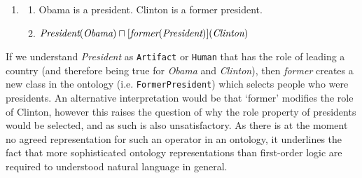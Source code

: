 \documentclass[11pt]{article}
\begin{document}
\begin{enumerate}
\item \begin{enumerate}
\item Obama is a president. Clinton is a former president. \label{ex:president1}
\item $\text{\em President}(\text{\em Obama}) \sqcap [\text{\em former}(\text{\em President})](\text{\em Clinton})$ \label{ex:president2}
\end{enumerate}
\end{enumerate}

If we understand {\em President} as \texttt{Artifact} or \texttt{Human} that has the role of leading a country
(and therefore being true for {\em Obama} and {\em Clinton}), then {\em former} creates a new class in the ontology (i.e. \texttt{FormerPresident}) which selects
people who were presidents.  An alternative
    interpretation would be that `former' modifies the role of Clinton, however this raises the
    question of why the role property of presidents would be selected, and as such
is also unsatisfactory. %
As there is at the moment no agreed representation for such an operator in an
ontology, it underlines the fact that more sophisticated ontology representations than first-order logic are required to understood natural
language in general.
\end{document}
